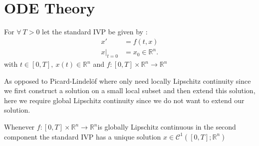 \section{ODE Theory}
\begin{definition}
 For $\forall \ T > 0 $ let the standard IVP be given by : 
 \begin{align*}
  x' &= f(t,x) \\
  x \vert_{t=0} &=  x_0 \in \mathbb{R}^{n} 
 .\end{align*}
 with $t \in  [0,T] ,\ x(t) \in  \mathbb{R}^{n} $ and $f : [0,T] \times \mathbb{R}^{n } \to \mathbb{R}^{n} $
 \end{definition}
 As opposed to Picard-Lindelöf where only need locally Lipschitz continuity since we first construct a solution on a small local subset and then extend this solution,
 here we require global Lipschitz continuity since we do not want to extend our solution.
\begin{theorem}\label{picard1}
  Whenever $f : [0,T] \times  \mathbb{R}^{n } \to \mathbb{R}^{n} $is globally Lipschitz continuous in the second component
  the standard IVP has a unique solution $x \in  \mathcal{C}^{1}([0,T] ; \mathbb{R}^{n} ) $
\end{theorem}
